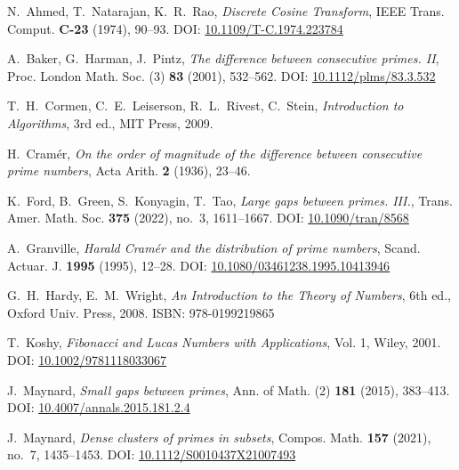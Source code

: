 \documentclass[12pt]{article}
\begin{document}
\bigskip

\nocite{*} %

\begin{thebibliography}{99}

N.~Ahmed, T.~Natarajan, K.~R.~Rao, 
\textit{Discrete Cosine Transform}, 
IEEE Trans. Comput. \textbf{C-23} (1974), 90--93. 
DOI: \href{https://doi.org/10.1109/T-C.1974.223784}{10.1109/T-C.1974.223784}

A.~Baker, G.~Harman, J.~Pintz, 
\textit{The difference between consecutive primes. II}, 
Proc. London Math. Soc. (3) \textbf{83} (2001), 532--562. 
DOI: \href{https://doi.org/10.1112/plms/83.3.532}{10.1112/plms/83.3.532}

T.~H.~Cormen, C.~E.~Leiserson, R.~L.~Rivest, C.~Stein, 
\textit{Introduction to Algorithms}, 
3rd ed., MIT Press, 2009.

H.~Cram\'{e}r, 
\textit{On the order of magnitude of the difference between consecutive prime numbers}, 
Acta Arith. \textbf{2} (1936), 23--46.

K.~Ford, B.~Green, S.~Konyagin, T.~Tao,
\textit{Large gaps between primes. III.},
Trans. Amer. Math. Soc. \textbf{375} (2022), no.~3, 1611--1667. 
DOI: \href{https://doi.org/10.1090/tran/8568}{10.1090/tran/8568}

A.~Granville, 
\textit{Harald Cram\'{e}r and the distribution of prime numbers}, 
Scand. Actuar. J. \textbf{1995} (1995), 12--28. 
DOI: \href{https://doi.org/10.1080/03461238.1995.10413946}{10.1080/03461238.1995.10413946}

G.~H.~Hardy, E.~M.~Wright, 
\textit{An Introduction to the Theory of Numbers}, 
6th ed., Oxford Univ. Press, 2008. 
ISBN: 978-0199219865

T.~Koshy, 
\textit{Fibonacci and Lucas Numbers with Applications}, 
Vol. 1, Wiley, 2001. 
DOI: \href{https://doi.org/10.1002/9781118033067}{10.1002/9781118033067}

J.~Maynard, 
\textit{Small gaps between primes}, 
Ann. of Math. (2) \textbf{181} (2015), 383--413. 
DOI: \href{https://doi.org/10.4007/annals.2015.181.2.4}{10.4007/annals.2015.181.2.4}

J.~Maynard,
\textit{Dense clusters of primes in subsets},
Compos. Math. \textbf{157} (2021), no.~7, 1435--1453. 
DOI: \href{https://doi.org/10.1112/S0010437X21007493}{10.1112/S0010437X21007493}


\end{thebibliography}
\end{document}

